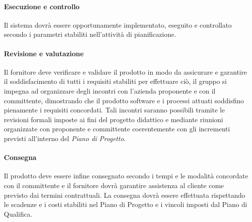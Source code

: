 \paragraph{Esecuzione e controllo}
Il sistema dovrà essere opportunamente implementato, eseguito e controllato secondo i parametri stabiliti nell'attività di pianificazione.

\paragraph{Revisione e valutazione}
Il fornitore deve verificare e validare il prodotto in modo da assicurare e garantire il soddisfacimento di tutti i requisiti stabiliti per effettuare ciò, il gruppo si impegna ad organizzare degli incontri con l'azienda proponente e con il committente, dimostrando che il prodotto software e i processi attuati soddisfino pienamente i requisiti concordati. Tali incontri saranno possibili tramite le revisioni formali imposte ai fini del progetto didattico e mediante riunioni organizzate con proponente e committente coerentemente con gli incrementi previsti all'interno del \textit{Piano di Progetto}\docs.

\paragraph{Consegna}
Il prodotto deve essere infine consegnato secondo i tempi e le modalità concordate con il committente e il fornitore dovrà garantire assistenza al cliente come previsto dai termini contrattuali. La consegna dovrà essere effettuata rispettando le scadenze e i costi stabiliti nel Piano di Progetto e i vincoli imposti dal Piano di Qualifica.


